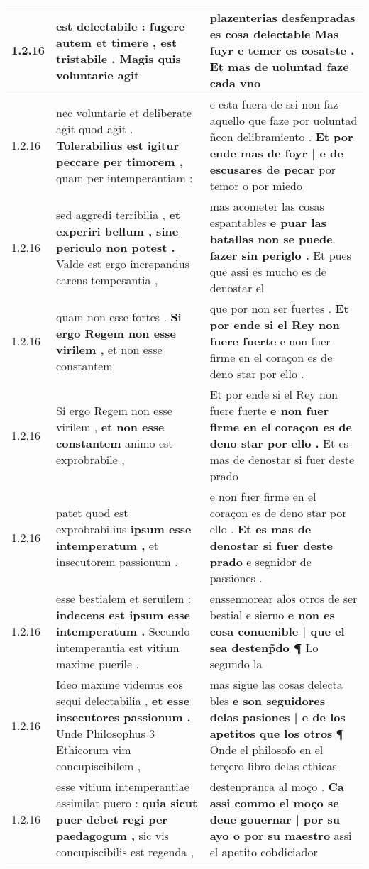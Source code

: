 \begin{tabular}{|p{1cm}|p{6.5cm}|p{6.5cm}|}
1.2.16 & est delectabile : \textbf{ fugere autem et timere , est tristabile . } Magis quis voluntarie agit & plazenterias desfenpradas es cosa delectable \textbf{ Mas fuyr e temer es cosatste . } Et mas de uoluntad faze cada vno \\\hline
1.2.16 & nec voluntarie et deliberate agit quod agit . \textbf{ Tolerabilius est igitur peccare per timorem , } quam per intemperantiam : & e esta fuera de ssi non faz aquello que faze por uoluntad ñcon delibramiento . \textbf{ Et por ende mas de foyr | e de escusares de pecar } por temor o por miedo \\\hline
1.2.16 & sed aggredi terribilia , \textbf{ et experiri bellum , sine periculo non potest . } Valde est ergo increpandus carens tempesantia , & mas acometer las cosas espantables \textbf{ e puar las batallas non se puede fazer sin periglo . } Et pues que assi es mucho es de denostar el \\\hline
1.2.16 & quam non esse fortes . \textbf{ Si ergo Regem non esse virilem , } et non esse constantem & que por non ser fuertes . \textbf{ Et por ende si el Rey non fuere fuerte } e non fuer firme en el coraçon es de deno star por ello . \\\hline
1.2.16 & Si ergo Regem non esse virilem , \textbf{ et non esse constantem } animo est exprobrabile , & Et por ende si el Rey non fuere fuerte \textbf{ e non fuer firme en el coraçon es de deno star por ello . } Et es mas de denostar si fuer deste prado \\\hline
1.2.16 & patet quod est exprobrabilius \textbf{ ipsum esse intemperatum , } et insecutorem passionum . & e non fuer firme en el coraçon es de deno star por ello . \textbf{ Et es mas de denostar si fuer deste prado } e segnidor de passiones . \\\hline
1.2.16 & esse bestialem et seruilem : \textbf{ indecens est ipsum esse intemperatum . } Secundo intemperantia est vitium maxime puerile . & enssennorear alos otros de ser bestial e sieruo \textbf{ e non es cosa conuenible | que el sea destenp̃do ¶ } Lo segundo la \\\hline
1.2.16 & Ideo maxime videmus eos sequi delectabilia , \textbf{ et esse insecutores passionum . } Unde Philosophus 3 Ethicorum vim concupiscibilem , & mas sigue las cosas delecta bles \textbf{ e son seguidores delas pasiones | e de los apetitos que los otros } ¶ Onde el philosofo en el terçero libro delas ethicas \\\hline
1.2.16 & esse vitium intemperantiae assimilat puero : \textbf{ quia sicut puer debet regi per paedagogum , } sic vis concupiscibilis est regenda , & destenpranca al moço . \textbf{ Ca assi commo el moço se deue gouernar | por su ayo o por su maestro } assi el apetito cobdiciador \\\hline

\end{tabular}
